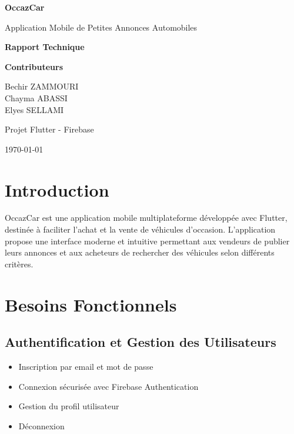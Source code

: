 \documentclass[11pt,a4paper]{article}
\begin{document}
\begin{titlepage}
    \centering
    \vspace*{2cm}
    
    {\Huge\bfseries\color{primarycolor} OccazCar\par}
    \vspace{0.5cm}
    {\Large\color{secondarycolor} Application Mobile de Petites Annonces Automobiles\par}
    
    \vspace{2cm}
    
    {\LARGE\bfseries Rapport Technique\par}
    
    \vspace{3cm}
    
    {\Large\textbf{Contributeurs}\par}
    \vspace{0.5cm}
    {\large
    Bechir ZAMMOURI\\
    Chayma ABASSI\\
    Elyes SELLAMI\par}
    
    \vfill
    
    {\large Projet Flutter - Firebase\par}
    {\large \today\par}
\end{titlepage}

\section{Introduction}

OccazCar est une application mobile multiplateforme développée avec Flutter, destinée à faciliter l'achat et la vente de véhicules d'occasion. L'application propose une interface moderne et intuitive permettant aux vendeurs de publier leurs annonces et aux acheteurs de rechercher des véhicules selon différents critères.

\section{Besoins Fonctionnels}

\subsection{Authentification et Gestion des Utilisateurs}
\begin{itemize}[leftmargin=*]
    \item Inscription par email et mot de passe
    \item Connexion sécurisée avec Firebase Authentication
    \item Gestion du profil utilisateur
    \item Déconnexion
\end{itemize}
\end{document}
